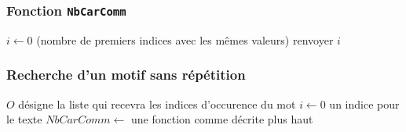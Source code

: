 \begin{frame}
  \frametitle{Fonction \texttt{NbCarComm}}
\begin{algorithm}[H]
  $i\leftarrow 0$ (nombre de premiers indices avec les mêmes valeurs)\;
  renvoyer $i$\;
  \caption{}
\end{algorithm}
\end{frame}

\begin{frame}
  \frametitle{Recherche d'un motif sans répétition}
\begin{algorithm}[H]
  $O$ désigne la liste qui recevra les indices d'occurence du mot\;
  $i\leftarrow 0$ un indice pour le texte \;
  $NbCarComm \leftarrow$ une fonction comme décrite plus haut\;
  \caption{}
\end{algorithm}
\end{frame}



